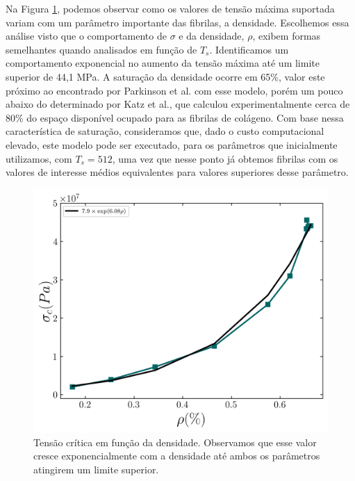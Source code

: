 \documentclass{article}
\begin{document}
Na Figura \ref{R6}, podemos observar como os valores de tensão máxima suportada variam com um parâmetro 
importante das fibrilas, a densidade. Escolhemos essa análise visto que o comportamento de \(\sigma\) e da 
densidade, \(\rho\), exibem formas semelhantes quando analisados em função de \(T_{s}\). Identificamos um 
comportamento exponencial no aumento da tensão máxima até um limite superior de 44,1 MPa. A saturação da 
densidade ocorre em 65\%, valor este próximo ao encontrado por Parkinson et al.\cite{Parkinson1995} com esse 
modelo, porém um pouco abaixo do determinado por Katz et al.\cite{KATZ1973351}, que calculou experimentalmente 
cerca de 80\% do espaço disponível ocupado para as fibrilas de colágeno. Com base nessa característica de 
saturação, consideramos que, dado o custo computacional elevado, este modelo pode ser executado, para os parâmetros 
que inicialmente utilizamos, com \(T_{s}=512\), uma vez que nesse ponto já obtemos fibrilas com os valores de 
interesse médios equivalentes para valores superiores desse parâmetro. 



\begin{figure}[H]
    \centering
    \includegraphics[width=\textwidth]{figures/sigma_rho.png}

    \caption{Tensão crítica em função da densidade. Observamos que esse valor cresce exponencialmente com a 
    densidade até ambos os parâmetros atingirem um limite superior.} 


    \label{R6}
\end{figure}
\end{document}
